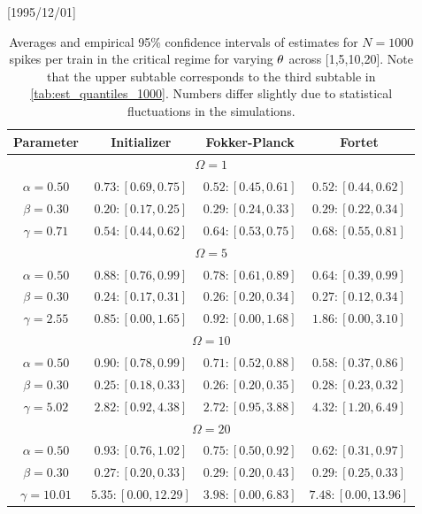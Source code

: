 \NeedsTeXFormat{LaTeX2e}[1995/12/01] \documentclass[10pt]{bmc_article}
\newenvironment{bmcformat}{\begin{raggedright}\baselineskip20pt\sloppy\setboolean{publ}{false}}{\end{raggedright}\baselineskip20pt\sloppy}
\begin{document}
\begin{bmcformat}
\begin{table}[htp]
\begin{center}
{\begin{tabular}{|c|ccc|} 
Parameter
& Initializer
& Fokker-Planck
& Fortet
\\ 
\hline \hline
\multicolumn{4}{|c|}{$\Omega=1$} \\[1mm]
$\alpha=0.50$
& $0.73 : [0.69, 0.75]$
& $0.52 : [0.45, 0.61]$
& $0.52 : [0.44, 0.62]$
\\
$\beta=0.30$
& $0.20 : [0.17, 0.25]$
& $0.29 : [0.24, 0.33]$
& $0.29 : [0.22, 0.34]$
\\
$\gamma=0.71$
& $0.54 : [0.44, 0.62]$
& $0.64 : [0.53, 0.75]$
& $0.68 : [0.55, 0.81]$
\\
\hline \hline
\multicolumn{4}{|c|}{$\Omega=5$} \\[1mm]
$\alpha=0.50$
& $0.88 : [0.76, 0.99]$
& $0.78 : [0.61, 0.89]$
& $0.64 : [0.39, 0.99]$
\\
$\beta=0.30$
& $0.24 : [0.17, 0.31]$
& $0.26 : [0.20, 0.34]$
& $0.27 : [0.12, 0.34]$
\\
$\gamma=2.55$
& $0.85 : [0.00, 1.65]$
& $0.92 : [0.00, 1.68]$
& $1.86 : [0.00, 3.10]$
\\
\hline \hline
\multicolumn{4}{|c|}{$\Omega=10$} \\[1mm]
$\alpha=0.50$
& $0.90 : [0.78, 0.99]$
& $0.71 : [0.52, 0.88]$
& $0.58 : [0.37, 0.86]$
\\
$\beta=0.30$
& $0.25 : [0.18, 0.33]$
& $0.26 : [0.20, 0.35]$
& $0.28 : [0.23, 0.32]$
\\
$\gamma=5.02$
& $2.82 : [0.92, 4.38]$
& $2.72 : [0.95, 3.88]$
& $4.32 : [1.20, 6.49]$
\\
\hline \hline
\multicolumn{4}{|c|}{$\Omega=20$} \\[1mm]
$\alpha=0.50$
& $0.93 : [0.76, 1.02]$
& $0.75 : [0.50, 0.92]$
& $0.62 : [0.31, 0.97]$
\\
$\beta=0.30$
& $0.27 : [0.20, 0.33]$
& $0.29 : [0.20, 0.43]$
& $0.29 : [0.25, 0.33]$
\\
$\gamma=10.01$
& $5.35 : [0.00, 12.29]$
& $3.98 : [0.00, 6.83]$
& $7.48 : [0.00, 13.96]$
\\
\hline
\end{tabular}}\\
\end{center}
\caption{Averages and empirical 95\% confidence intervals of estimates for $N=1000$
spikes per train in the critical regime for varying ${\theta}$ across
[1,5,10,20]. Note that the upper subtable corresponds to the third
subtable in \cref{tab:est_quantiles_1000}. Numbers differ slightly due to statistical
fluctuations in the simulations. }
\label{tab:thetas_est_quantiles_1000}
\end{table}
\end{bmcformat}
\end{document}
